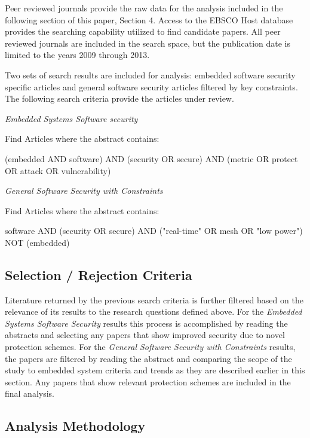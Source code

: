 \documentclass[final,conference,11pt]{IEEEtran}
\begin{document}
Peer reviewed journals provide the raw data for the analysis included in the following section of this paper, Section 4.  Access to the EBSCO Host database provides the searching capability utilized to find candidate papers.  All peer reviewed journals are included in the search space, but the publication date is limited to the years 2009 through 2013.

Two sets of search results are included for analysis: embedded software security specific articles and general software security articles filtered by key constraints.  The following search criteria provide the articles under review. 

\textit{Embedded Systems Software security}

Find Articles where the abstract contains:
\begin{center}
(embedded AND software) AND (security OR secure) AND (metric OR protect OR attack OR vulnerability)
\end{center}

\textit{General Software Security with Constraints}

Find Articles where the abstract contains:
\begin{center}
software AND (security OR secure) AND ("real-time" OR mesh OR "low power") NOT (embedded)
\end{center}

\subsection{Selection / Rejection Criteria}

Literature returned by the previous search criteria is further filtered based on the relevance of its results to the research questions defined above.  For the \textit{Embedded Systems Software Security} results this process is accomplished by reading the abstracts and selecting any papers that show improved security due to novel protection schemes. For the \textit{General Software Security with Constraints} results, the papers are filtered by reading the abstract and comparing the scope of the study to embedded system criteria and trends as they are described earlier in this section. Any papers that show relevant protection schemes are included in the final analysis.

\subsection{Analysis Methodology}
\end{document}
